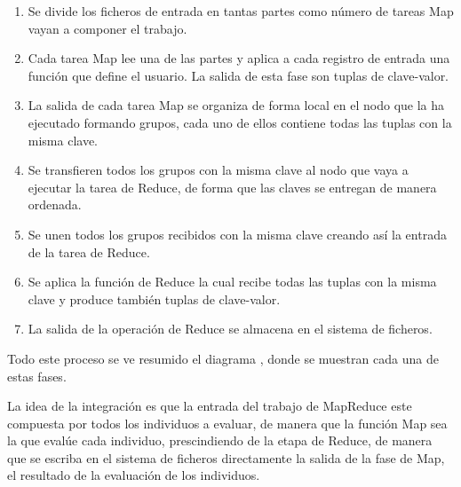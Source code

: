 \begin{enumerate}
	\item Se divide los ficheros de entrada en tantas partes como n\'umero de tareas Map vayan a componer el trabajo.
	\item Cada tarea Map lee una de las partes y aplica a cada registro de entrada una función que define el usuario. La salida de esta fase son tuplas de clave-valor.
	\item La salida de cada tarea Map se organiza de forma local en el nodo que la ha ejecutado formando grupos, cada uno de ellos contiene todas las tuplas con la misma clave.
	\item Se transfieren todos los grupos con la misma clave al nodo que vaya a ejecutar la tarea de Reduce, de forma que las claves se entregan de manera ordenada.
	\item Se unen todos los grupos recibidos con la misma clave creando así la entrada de la tarea de Reduce.
	\item Se aplica la función de Reduce la cual recibe todas las tuplas con la misma clave y produce también tuplas de clave-valor.
	\item La salida de la operación de Reduce se almacena en el sistema de ficheros.
\end{enumerate}

Todo este proceso se ve resumido el diagrama , donde se muestran cada una de estas fases.

La idea de la integración es que la entrada del trabajo de MapReduce este compuesta por todos los individuos a evaluar, de manera que la función Map sea la que evalúe cada individuo, prescindiendo de la etapa de Reduce, de manera que se escriba en el sistema de ficheros directamente la salida de la fase de Map, el resultado de la evaluación de los individuos.











